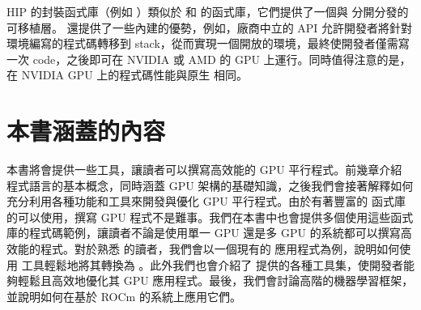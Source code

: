 HIP 的封裝函式庫（例如 ）類似於  和  的函式庫，它們提供了一個與  分開分發的可移植層。 還提供了一些內建的優勢，例如，廠商中立的  API 允許開發者將針對  環境編寫的程式碼轉移到  stack，從而實現一個開放的環境，最終使開發者僅需寫一次 code，之後即可在 NVIDIA 或 AMD 的 GPU 上運行。同時值得注意的是， 在 NVIDIA GPU 上的程式碼性能與原生  相同。

\section{本書涵蓋的內容}
本書將會提供一些工具，讓讀者可以撰寫高效能的 GPU 平行程式。前幾章介紹  程式語言的基本概念，同時涵蓋 GPU 架構的基礎知識，之後我們會接著解釋如何充分利用各種功能和工具來開發與優化 GPU 平行程式。由於有著豐富的  函式庫的可以使用，撰寫 GPU 程式不是難事。我們在本書中也會提供多個使用這些函式庫的程式碼範例，讓讀者不論是使用單一 GPU 還是多 GPU 的系統都可以撰寫高效能的程式。對於熟悉  的讀者，我們會以一個現有的  應用程式為例，說明如何使用  工具輕鬆地將其轉換為 。此外我們也會介紹了  提供的各種工具集，使開發者能夠輕鬆且高效地優化其 GPU 應用程式。最後，我們會討論高階的機器學習框架，並說明如何在基於 ROCm 的系統上應用它們。
